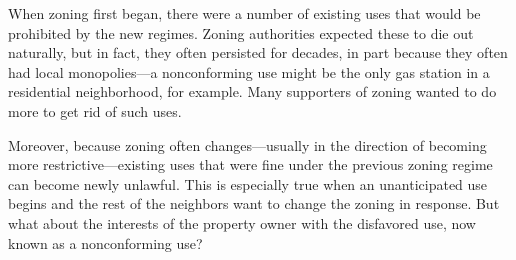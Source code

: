 When zoning first began, there were a number of existing uses that would be
prohibited by the new regimes. Zoning authorities expected these to die out
naturally, but in fact, they often persisted for decades, in part because they
often had local monopolies---a nonconforming use might be the only gas station
in a residential neighborhood, for example. Many supporters of zoning wanted to
do more to get rid of such uses.

Moreover, because zoning often changes---usually in the direction of becoming
more restrictive---existing uses that were fine under the previous zoning regime
can become newly unlawful. This is especially true when an unanticipated use
begins and the rest of the neighbors want to change the zoning in response. But
what about the interests of the property owner with the disfavored use, now
known as a nonconforming use?

